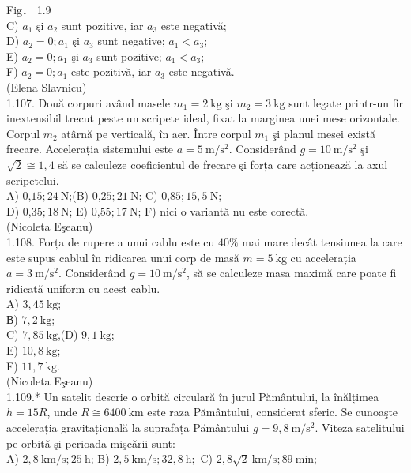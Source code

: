 \documentclass[10pt]{article}
\begin{document}
Fig． 1.9\\
C) $a_{1}$ şi $a_{2}$ sunt pozitive, iar $a_{3}$ este negativă;\\
D) $a_{2}=0 ; a_{1}$ şi $a_{3}$ sunt negative; $a_{1}<a_{3}$;\\
E) $a_{2}=0 ; a_{1}$ şi $a_{3}$ sunt pozitive; $a_{1}<a_{3}$;\\
F) $a_{2}=0 ; a_{1}$ este pozitivă, iar $a_{3}$ este negativă.\\
(Elena Slavnicu)\\
1.107. Două corpuri având masele $m_{1}=2 \mathrm{~kg}$ şi $m_{2}=3 \mathrm{~kg}$ sunt legate printr-un fir inextensibil trecut peste un scripete ideal, fixat la marginea unei mese orizontale. Corpul $m_{2}$ atârnă pe verticală, în aer. Între corpul $m_{1}$ şi planul mesei există frecare. Accelerația sistemului este $a=5 \mathrm{~m} / \mathrm{s}^{2}$. Considerând $g=10 \mathrm{~m} / \mathrm{s}^{2}$ şi $\sqrt{2} \cong 1,4$ să se calculeze coeficientul de frecare şi forța care acționează la axul scripetelui.\\
A) 0,$15 ; 24 \mathrm{~N}$;(B) 0,$25 ; 21 \mathrm{~N}$; C) 0,$85 ; 15,5 \mathrm{~N}$;\\
D) 0,$35 ; 18 \mathrm{~N}$; E) 0,$55 ; 17 \mathrm{~N}$; F) nici o variantă nu este corectă.\\
(Nicoleta Eşeanu)\\
1.108. Forța de rupere a unui cablu este cu $40 \%$ mai mare decât tensiunea la care este supus cablul în ridicarea unui corp de masă $m=5 \mathrm{~kg}$ cu accelerația $a=3 \mathrm{~m} / \mathrm{s}^{2}$. Considerând $g=10 \mathrm{~m} / \mathrm{s}^{2}$, să se calculeze masa maximă care poate fi ridicată uniform cu acest cablu.\\
A) $3,45 \mathrm{~kg}$;\\
В) $7,2 \mathrm{~kg}$;\\
C) $7,85 \mathrm{~kg}$,(D) $9,1 \mathrm{~kg}$;\\
E) $10,8 \mathrm{~kg}$;\\
F) $11,7 \mathrm{~kg}$.\\
(Nicoleta Eşeanu)\\
1.109.* Un satelit descrie o orbită circulară în jurul Pământului, la înălțimea $h=15 R$, unde $R \cong 6400 \mathrm{~km}$ este raza Pământului, considerat sferic. Se cunoaşte accelerația gravitațională la suprafața Pământului $g=9,8 \mathrm{~m} / \mathrm{s}^{2}$. Viteza satelitului pe orbită şi perioada mişcării sunt:\\
A) $2,8 \mathrm{~km} / \mathrm{s} ; 25 \mathrm{~h}$; B) $2,5 \mathrm{~km} / \mathrm{s} ; 32,8 \mathrm{~h} ;$ C) $2,8 \sqrt{2} \mathrm{~km} / \mathrm{s} ; 89 \mathrm{~min}$;\\
\end{document}
